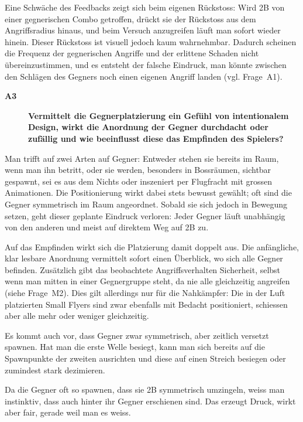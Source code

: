 \documentclass[../Main.tex]{subfiles}
\begin{document}
Eine Schwäche des Feedbacks zeigt sich beim eigenen Rückstoss: Wird 2B von einer gegnerischen Combo getroffen, drückt sie der Rückstoss aus dem Angriffsradius hinaus, und beim Versuch anzugreifen läuft man sofort wieder hinein. Dieser Rückstoss ist visuell jedoch kaum wahrnehmbar. Dadurch scheinen die Frequenz der gegnerischen Angriffe und der erlittene Schaden nicht übereinzustimmen, und es entsteht der falsche Eindruck, man könnte zwischen den Schlägen des Gegners noch einen eigenen Angriff landen (vgl. Frage~A1).

\begin{description}
  \item[\textbf{A3}] \textbf{Vermittelt die Gegnerplatzierung ein Gefühl von intentionalem Design, wirkt die Anordnung der Gegner durchdacht oder zufällig und wie beeinflusst diese das Empfinden des Spielers?}
\end{description}

Man trifft auf zwei Arten auf Gegner: Entweder stehen sie bereits im Raum, wenn man ihn betritt, oder sie werden, besonders in Bossräumen, sichtbar gespawnt, sei es aus dem Nichts oder inszeniert per Flugfracht mit grossen Animationen. Die Positionierung wirkt dabei stets bewusst gewählt; oft sind die Gegner symmetrisch im Raum angeordnet. Sobald sie sich jedoch in Bewegung setzen, geht dieser geplante Eindruck verloren: Jeder Gegner läuft unabhängig von den anderen und meist auf direktem Weg auf 2B zu.

Auf das Empfinden wirkt sich die Platzierung damit doppelt aus. Die anfängliche, klar lesbare Anordnung vermittelt sofort einen Überblick, wo sich alle Gegner befinden. Zusätzlich gibt das beobachtete Angriffsverhalten Sicherheit, selbst wenn man mitten in einer Gegnergruppe steht, da nie alle gleichzeitig angreifen (siehe Frage~M2). Dies gilt allerdings nur für die Nahkämpfer: Die in der Luft platzierten Small Flyers sind zwar ebenfalls mit Bedacht positioniert, schiessen aber alle mehr oder weniger gleichzeitig.

Es kommt auch vor, dass Gegner zwar symmetrisch, aber zeitlich versetzt spawnen. Hat man die erste Welle besiegt, kann man sich bereits auf die Spawnpunkte der zweiten ausrichten und diese auf einen Streich besiegen oder zumindest stark dezimieren.

Da die Gegner oft so spawnen, dass sie 2B symmetrisch umzingeln, weiss man instinktiv, dass auch hinter ihr Gegner erschienen sind. Das erzeugt Druck, wirkt aber fair, gerade weil man es weiss.
\end{document}
